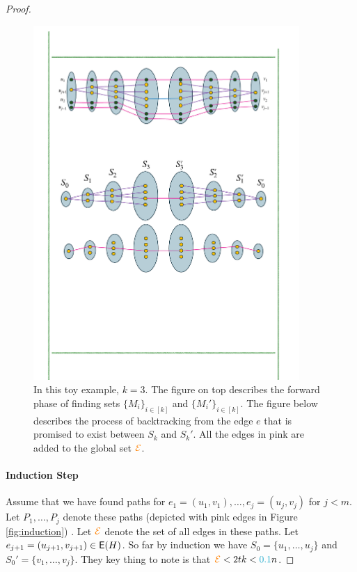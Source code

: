 \documentclass[11pt]{article}
\begin{document}
\begin{proof}
\begin{figure}
	\includegraphics[width=0.9\textwidth
	]{assets/BaseA.pdf}
	\caption{In this toy example, $k=3$. The figure on top describes the forward phase of finding sets $\{M_i\}_{i\in [k]}$ and $\{M_i'\}_{i\in [k]}$. The figure below describes the process of backtracking from the edge $e$ that is promised to exist between $S_k$ and $S_k'$.
    All the edges in pink are added to the global set $\textcolor{orange}{\mathcal{E}}$.}
	\label{fig:baseB}
\end{figure}



\paragraph{Induction Step}
	
Assume that we have found paths for $e_1 = (u_1, v_1), \dots, e_j=(u_j, v_j)$ for $j < m$.
Let $P_1, \dots, P_j$ denote these paths (depicted with \textcolor{carminepink}{pink} edges in Figure \ref{fig:induction}) .
Let $\textcolor{orange}{\mathcal{E}}$ denote the set of all edges in these paths.
Let $e_{j+1} = (u_{j+1},v_{j+1}) \in \mathsf{E}(H)$.
So far by induction we have $S_0 = \{u_1, \dots, u_j\}$ and $S_0' = \{v_1, \dots, v_j\}$.
They key thing to note is that $\GlobalEdgeSet <  2tk < \epsilonA n$.


\end{proof}
\end{document}
